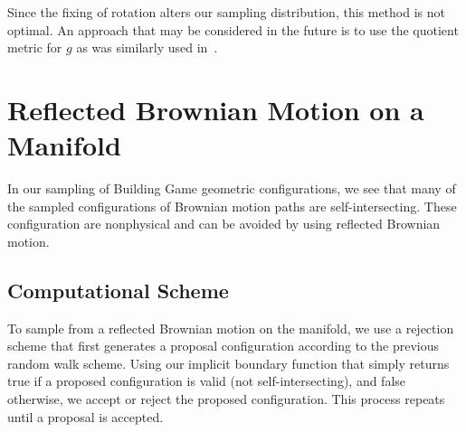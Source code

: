 Since the fixing of rotation alters our sampling distribution, this method is not optimal. An approach that may be considered in the future is to use the quotient metric for $g$ as was similarly used in~\cite{Holmes-Cerfon2013}. 

\section{Reflected Brownian Motion on a Manifold}

In our sampling of Building Game geometric configurations, we see that many of the sampled configurations of Brownian motion paths are self-intersecting. These configuration are nonphysical and can be avoided by using reflected Brownian motion. 

\subsection{Computational Scheme}

To sample from a reflected Brownian motion on the manifold, we use a rejection scheme that first generates a proposal configuration according to the previous random walk scheme. Using our implicit boundary function that simply returns true if a proposed configuration is valid (not self-intersecting), and false otherwise, we accept or reject the proposed configuration. This process repeats until a proposal is accepted. 


